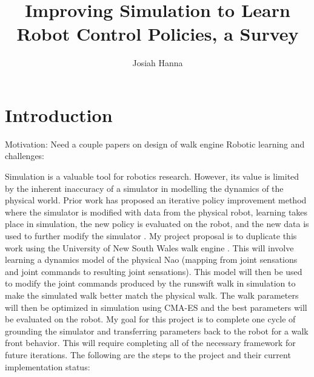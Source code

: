 \documentclass[12 pt]{article}
\author{Josiah Hanna}
\title{Improving Simulation to Learn Robot Control Policies, a Survey}
\begin{document}
\maketitle

\section{Introduction}

Motivation: Need a couple papers on design of walk engine \cite{ashar2014robocup} \cite{simspark}
Robotic learning and challenges: \cite{kober2013reinforcement}


Simulation is a valuable tool for robotics research. 
However, its value is limited by the inherent inaccuracy of a simulator in modelling the dynamics of the physical world. 
Prior work has proposed an iterative policy improvement method where the simulator is modified with data from the physical robot, learning takes place in simulation, the new policy is evaluated on the robot, and the new data is used to further modify the simulator \cite{farchy2013humanoid}.
My project proposal is to duplicate this work using the University of New South Wales walk engine \cite{ashar2014robocup}. 
This will involve learning a dynamics model of the physical Nao (mapping from joint sensations and joint commands to resulting joint sensations). 
This model will then be used to modify the joint commands produced by the runswift walk in simulation to make the simulated walk better match the physical walk. 
The walk parameters will then be optimized in simulation using CMA-ES and the best parameters will be evaluated on the robot. 
My goal for this project is to complete one cycle of grounding the simulator and transferring parameters back to the robot for a walk front behavior. 
This will require completing all of the necessary framework for future iterations.
The following are the steps to the project and their current implementation status:
\end{document}

